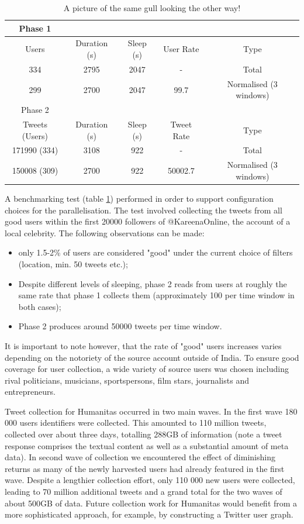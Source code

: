 \begin{table}
\begin{center}
\begin{tabular}{ | c | c | c | c | c | }
\hline
Phase 1  \\ \hline
Users & Duration (s) & Sleep (s) & User Rate & Type \\ \hline
334 & 2795 & 2047 & - & Total \\ \hline
299 & 2700 & 2047 & 99.7 & Normalised (3 windows) \\ \hline
Phase 2 \\ \hline
Tweets (Users) & Duration (s) & Sleep (s) & Tweet Rate & Type \\ \hline
171990 (334) & 3108 & 922 & - & Total \\ \hline
150008 (309) & 2700 & 922 & 50002.7 &  Normalised (3 windows) \\ \hline
\end{tabular}
\end{center}
\caption{A picture of the same gull looking the other way!}
\label{table:benchmark}
\end{table}

A benchmarking test (table \ref{table:benchmark}) performed in order to support configuration choices for the parallelisation. The test involved collecting the tweets from all good users within the first 20000 followers of @KareenaOnline, the account of a local celebrity. The following observations can be made:

\begin{itemize}
\item only 1.5-2\% of users are considered "good" under the current choice of filters (location, min. 50 tweets etc.);
\item Despite different levels of sleeping, phase 2 reads from users at roughly the same rate that phase 1 collects them (approximately 100 per time window in both cases);
\item Phase 2 produces around 50000 tweets per time window.
\end{itemize}

It is important to note however, that the rate of "good" users increases varies depending on the notoriety of the source account outside of India. To ensure good coverage for user collection, a wide variety of source users was chosen including rival politicians, musicians, sportspersons, film stars, journalists and entrepreneurs.

Tweet collection for Humanitas occurred in two main waves. In the first wave 180 000 users identifiers were collected. This amounted to 110 million tweets, collected over about three days, totalling 288GB of information (note a tweet response comprises the textual content as well as a substantial amount of meta data). In second wave of collection we encountered the effect of diminishing returns as many of the newly harvested users had already featured in the first wave. Despite a lengthier collection effort, only 110 000 new users were collected, leading to 70 million additional tweets and a grand total for the two waves of about 500GB of data. Future collection work for Humanitas would benefit from a more sophisticated approach, for example, by constructing a Twitter user graph.

